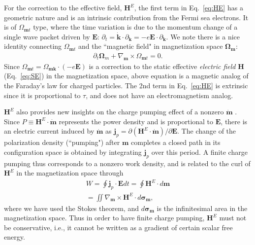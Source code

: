 \documentclass[aps,prb,twocolumn,showpacs,superscriptaddress]{revtex4-1}
\begin{document}
For the correction to the effective field, $\bm H^E$, the first term in Eq.~\ref{eq:HE} has a geometric nature and is an intrinsic contribution from the Fermi sea electrons. It is of $\Omega_{\bm{m}t}$ type, where the time variation is due to the momentum change of a single wave packet driven by $\bm E$: $\partial_t = \dot{\bm{k}}\cdot \partial_{\bm{k}}  = -e\bm{E} \cdot \partial_{\bm{k}}$. We note there is a nice identity connecting $\Omega_{\bm{m}t}$ and the ``magnetic field" in magnetization space $\bm \Omega_{\bm m}$:
\begin{eqnarray}
\partial_t \bm{{\Omega}}_m + \nabla_{\bm{m}} \times \Omega_{\bm{m}t}= 0.
\end{eqnarray}
Since $\Omega_{\bm{m}t} = \Omega_{\bm{m}\bm k}\cdot (-e\bm E)$ is a correction to the static effective \emph{electric field} $\bm H$ (Eq.~\ref{eq:SE}) in the magnetization space, above equation is a magnetic analog of the Faraday's law for charged particles. The 2nd term in Eq.~\ref{eq:HE} is extrinsic since it is proportional to $\tau$, and does not have an electromagnetism analog.

$\bm H^E$ also provides new insights on the charge pumping effect of a nonzero $\dot{\bm m}$ \cite{Freimuth:2015,TI_SOT_aa}. Since $P\equiv \bm H^E\cdot \dot{\bm m}$ represents the power density and is proportional to $\bm E$, there is an electric current induced by $\dot{\bm m}$ as $\bm j_p = \partial(\bm H^E\cdot \dot{\bm m})/\partial \bm E$. The change of the polarization density (``pumping") after $\bm m$ completes a closed path in its configuration space is obtained by integrating $\bm j_p$ over this period. A finite charge pumping thus corresponds to a nonzero work density, and is related to the curl of $\bm H^E$ in the magnetization space through
\begin{eqnarray}\label{eq:Work}
W = \oint \bm j_p\cdot \bm E dt = \oint \bm H^E\cdot d\bm m \\\nonumber
= \iint \nabla_{\bm m}\times \bm H^E \cdot d\bm \sigma_{\bm m},
\end{eqnarray}
where we have used the Stokes theorem, and $d\bm \sigma_{\bm m}$ is the infinitesimal area in the magnetization space. Thus in order to have finite charge pumping, $\bm H^E$ must not be conservative, i.e., it cannot be written as a gradient of certain scalar free energy.
 
\end{document}

